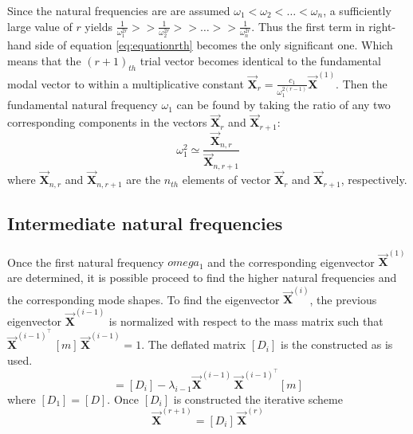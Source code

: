 Since the natural frequencies are are assumed \(\omega_1 < \omega_2 < \dots <
\omega_n\), a sufficiently large value of \(r\) yields \(\frac{1}{\omega_1^{2r}}
>> \frac{1}{\omega_2^{2r}} >> \dots >> \frac{1}{\omega_n^{2r}}\). Thus the first
term in right-hand side of equation \eqref{eq:equationrth} becomes the only
significant one.
Which means that the \((r+1)_{th}\) trial vector becomes identical to the
fundamental modal vector to within a multiplicative constant
\(\vec{\mathbf{X}}_{r} = \frac{c_1}{\omega^{2(r-1)}_{1}}\vec{\mathbf{X}}^{(1)}\).
Then the fundamental natural frequency \(\omega_1\) can be found by taking the
ratio of any two corresponding components in the vectors \(\vec{\mathbf{X}}_{r}\)
and \(\vec{\mathbf{X}}_{r+1}\):
\begin{equation}
  \omega_1^{2} \simeq \frac{\vec{\mathbf{X}}_{n,r}}{\vec{\mathbf{X}}_{n,r+1}}
\end{equation}
where \(\vec{\mathbf{X}}_{n,r}\) and \(\vec{\mathbf{X}}_{n,r+1}\) are the
\(n_{th}\) elements of vector \(\vec{\mathbf{X}}_{r}\) and
\(\vec{\mathbf{X}}_{r+1}\), respectively.
\subsection{Intermediate natural frequencies}
Once the first natural frequency \(omega_1\) and the corresponding eigenvector
\(\vec{\mathbf{X}}^{(1)}\) are determined, it is possible proceed to find the
higher natural frequencies and the corresponding mode shapes.
To find the eigenvector \(\vec{\mathbf{X}}^{(i)}\), the previous eigenvector
\(\vec{\mathbf{X}}^{(i-1)}\) is normalized with respect to the mass matrix such
that \(\vec{\mathbf{X}}^{(i-1)^\top}\,[m]\,\vec{\mathbf{X}}^{(i-1)} = 1\).
The deflated matrix \([D_i]\) is the constructed as is used.
\begin{equation}
  [D_i] =
  [D_i] - \lambda_{i-1}\vec{\mathbf{X}}^{(i-1)}\,\vec{\mathbf{X}}^{(i-1)^\top}[m]
\end{equation}
where \([D_1] = [D]\).
Once \([D_i]\) is constructed the iterative scheme
\begin{equation}
  \vec{\mathbf{X}}^{(r+1)} = [D_i]\,\vec{\mathbf{X}}^{(r)}
\end{equation}
%
